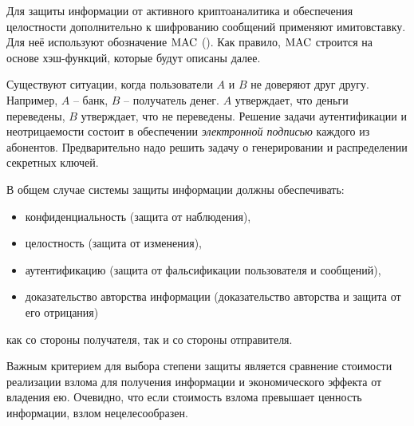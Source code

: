 Для защиты информации от активного криптоаналитика и обеспечения целостности дополнительно к шифрованию сообщений применяют имитовставку. Для неё используют обозначение $\textrm{MAC}$ (). Как правило, $\textrm{MAC}$ строится на основе хэш-функций, которые будут описаны далее.

Существуют ситуации, когда пользователи $A$ и $B$ не доверяют друг другу. Например, $A$ -- банк, $B$ -- получатель денег. $A$ утверждает, что деньги переведены, $B$ утверждает, что не переведены. Решение задачи аутентификации и неотрицаемости состоит в обеспечении \emph{электронной подписью} каждого из абонентов. Предварительно надо решить задачу о генерировании и распределении секретных ключей.

В общем случае системы защиты информации должны обеспечивать:
\begin{itemize}
    \item конфиденциальность (защита от наблюдения),
    \item целостность (защита от изменения),
    \item аутентификацию (защита от фальсификации пользователя и сообщений),
    \item доказательство авторства информации (доказательство авторства и защита от его отрицания)
\end{itemize}
как со стороны получателя, так и со стороны отправителя.

Важным критерием для выбора степени защиты является сравнение стоимости реализации взлома для получения информации и экономического эффекта от владения ею. Очевидно, что если стоимость взлома превышает ценность информации, взлом нецелесообразен.

